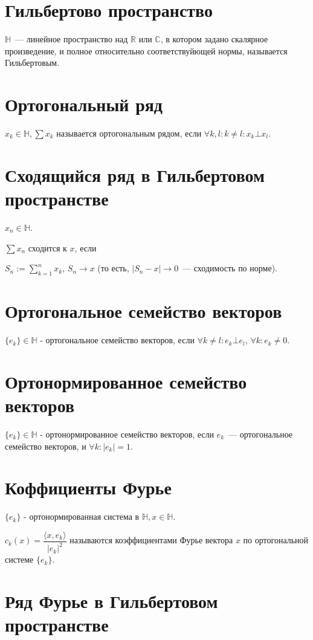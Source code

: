 \documentclass[paper=a4, fontsize=17pt]{article}
\begin{document}
	
	\section{Гильбертово пространство}
	$\mathds{H}$~--- линейное пространство над $\mathds{R}$ или $\mathds{C}$, в котором задано скалярное произведение, и полное относительно соответствуйющей нормы, называется Гильбертовым.

	\section{Ортогональный ряд}
	$x_k \in \mathds{H}, \sum x_k$ называется ортогональным рядом, если $\forall k, l: k \neq l: x_k \bot x_l$.

	\section{Сходящийся ряд в Гильбертовом пространстве}
	$x_n \in \mathds{H}$.

	$\sum x_n$ сходится к $x$, если

	$S_n := \sum\limits_{k = 1}^n x_k$, $S_n \rightarrow x$ (то есть, $|S_n - x| \rightarrow 0$~--- сходимость по норме).

	\section{Ортогональное семейство векторов}
	$\{e_k\} \in \mathds{H}$ - ортогональное семейство векторов, если $\forall k \neq l: e_k \bot e_l$, $\forall k: e_k \neq 0$.

	\section{Ортонормированное семейство векторов}
	$\{e_k\} \in \mathds{H}$ - ортонормированное семейство векторов, если ${e_k}$~--- ортогональное семейство векторов, и $\forall k: |e_k| = 1$.

	\section{Коффициенты Фурье}
	$\{e_k\}$ - ортонормированная система в $\mathds{H}, x \in \mathds{H}$.

	$c_k(x) = \dfrac{\langle x, e_k \rangle}{|e_k|^2}$ называются коэффициентами Фурье вектора $x$ по ортогональной системе $\{e_k\}$.

	\section{Ряд Фурье в Гильбертовом пространстве}
\end{document}
